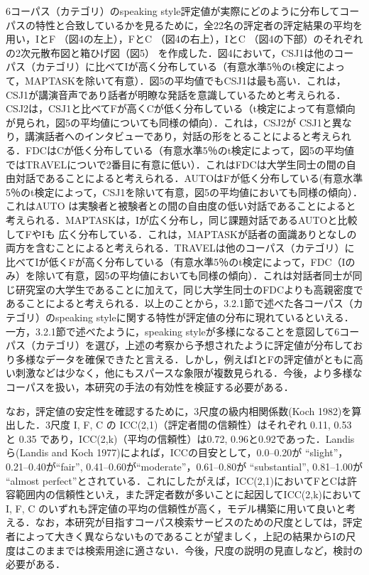 \documentclass[japanese]{jnlp_1.4}
\begin{document}
6コーパス（カテゴリ）のspeaking style評定値が実際にどのように分布してコーパスの特性と合致しているかを見るために，全22名の評定者の評定結果の平均を用い，IとF （図4の左上），FとC （図4の右上），IとC （図4の下部）のそれぞれの2次元散布図と箱ひげ図（図5）\linebreak
を作成した．図4において，CSJ1は他のコーパス（カテゴリ）に比べてIが高く分布している（有意水準5％のt検定によって，MAPTASKを除いて有意）．図5の平均値でもCSJ1は最も高い．これは，CSJ1が講演音声であり話者が明瞭な発話を意識しているためと考えられる．CSJ2は，CSJ1と比べてFが高くCが低く分布している（t検定によって有意傾向が見られ，図5の平均値についても同様の傾向）．これは，CSJ2が CSJ1と異なり，講演話者へのインタビューであり，対話の形をとることによると考えられる．FDCはCが低く分布している（有意水準5％のt検定によって，図5の平均値ではTRAVELについで2番目に有意に低い）．これはFDCは大学生同士の間の自由対話であることによると考えられる．AUTOはFが低く分布している(有意水準5％のt検定によって，CSJ1を除いて有意，図5の平均値においても同様の傾向）．これはAUTO は実験者と被験者との間の自由度の低い対話であることによると考えられる．MAPTASKは，Iが広く分布し，同じ課題対話であるAUTOと比較してFやIも 広く分布している．これは，MAPTASKが話者の面識ありとなしの両方を含むことによると考えられる．TRAVELは他のコーパス（カテゴリ）に比べてIが低くFが高く分布している（有意水準5％のt検定によって，FDC（Iのみ）を除いて有意，図5の平均値においても同様の傾向）．これは対話者同士が同じ研究室の大学生であることに加えて，同じ大学生同士のFDCよりも高親密度であることによると考えられる．以上のことから，3.2.1節で述べた各コーパス（カテゴリ）のspeaking styleに関する特性が評定値の分布に現れているといえる．一方，3.2.1節で述べたように，speaking styleが多様になることを意図して6コーパス（カテゴリ）を選び，上述の考察から予想されたように評定値が分布しており多様なデータを確保できたと言える．しかし，例えばIとFの評定値がともに高い刺激などは少なく，他にもスパースな象限が複数見られる．今後，より多様なコーパスを扱い，本研究の手法の有効性を検証する必要がある．

なお，評定値の安定性を確認するために，3尺度の級内相関係数(Koch 1982)を算出した．3尺度 I, F, C の ICC(2,1)（評定者間の信頼性）はそれぞれ 0.11, 0.53 と 0.35 であり，ICC(2,k)（平均の信頼性）は0.72, 0.96と0.92であった．Landisら(Landis and Koch 1977)によれば，ICCの目安として，0.0--0.20が ``slight''，0.21--0.40が``fair'', 0.41--0.60が``moderate''，0.61--0.80が ``substantial'', 0.81--1.00が ``almost perfect''とされている．これにしたがえば，ICC(2,1)においてFとCは許容範囲内の信頼性といえ，また評定者数が多いことに起因してICC(2,k)において I, F, C のいずれも評定値の平均の信頼性が高く，モデル構築に用いて良いと考える．なお，本研究が目指すコーパス検索サービスのための尺度としては，評定者によって大きく異ならないものであることが望ましく，上記の結果からIの尺度はこのままでは検索用途に適さない．今後，尺度の説明の見直しなど，検討の必要がある．
\end{document}
